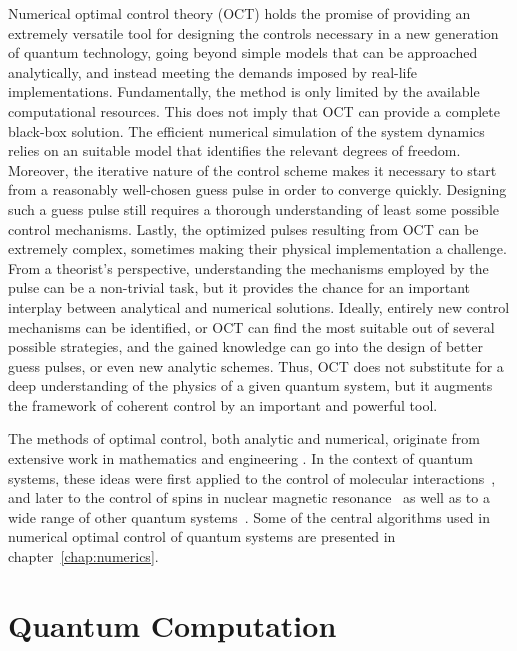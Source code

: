 Numerical optimal control theory (OCT) holds the promise of providing
an extremely versatile tool for designing the controls necessary in a new
generation of quantum technology, going beyond simple models that can be
approached analytically, and instead meeting the demands imposed by real-life
implementations. Fundamentally, the method is only limited by the available
computational resources.
This does not imply that OCT can provide a complete black-box solution. The
efficient numerical simulation of the system dynamics relies on an suitable
model that identifies the relevant degrees of freedom.
Moreover, the iterative nature of the control scheme makes it necessary to start
from a reasonably well-chosen guess pulse in order to converge quickly.
Designing such a guess pulse still requires a thorough understanding of
least some possible control mechanisms. Lastly, the optimized pulses
resulting from OCT can be extremely complex, sometimes making their physical
implementation a challenge. From a theorist's perspective, understanding
the mechanisms employed by the pulse can be a non-trivial task, but it provides
the chance for an important interplay between analytical and numerical
solutions. Ideally, entirely new control mechanisms can be identified, or OCT
can find the most suitable out of several possible strategies, and the gained
knowledge can go into the design of better guess pulses, or even new analytic
schemes.  Thus, OCT does not substitute for a deep understanding of the physics
of a given quantum system, but it augments the framework of coherent control by
an important and powerful tool.

\enlargethispage{\baselineskip}
The methods of optimal control, both analytic and numerical, originate from
extensive work in mathematics and engineering
\cite{BellmanBook, PontryaginBook, NocedalBook, BoydBandenberghe, KrotovBook}.
In the context of quantum systems, these ideas were first applied
to the control of molecular interactions~\cite{RiceZhao, BrumerShapiro}, and
later to the control of spins in nuclear magnetic resonance~\cite{SkinnerJMR2003,
KhanejaJMR05, TosnerJMR2009} as well as to a wide range of other quantum
systems~\cite{BrifNJP2010}.
Some of the central algorithms used in numerical optimal control of quantum
systems are presented in chapter~\ref{chap:numerics}.


\section{Quantum Computation}
\label{sec:intro_qc}

